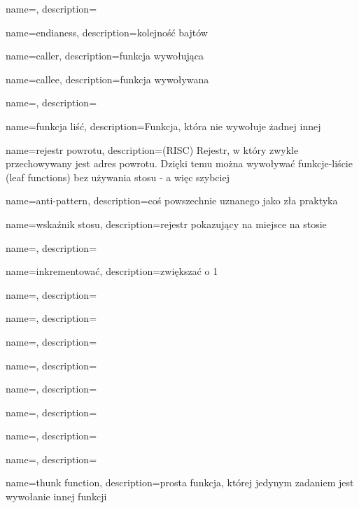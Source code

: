 {
  name={\PLph},
  description={\PLph}
}

{
  name={endianess},
  description={kolejność bajtów}
}

{
  name={caller},
  description={funkcja wywołująca}
}

{
  name={callee},
  description={funkcja wywoływana}
}

{
  name={\PLph},
  description={\PLph}
}

{
  name={funkcja liść},
  description={Funkcja, która nie wywołuje żadnej innej}
}

{
  name={rejestr powrotu},
  description=(RISC) {Rejestr, w który zwykle przechowywany jest adres powrotu. Dzięki temu można wywoływać funkcje-liście (leaf functions) bez używania stosu - a więc szybciej}
}

{
  name={anti-pattern},
  description={coś powszechnie uznanego jako zła praktyka}
}

{
  name=wskaźnik stosu,
  description={rejestr pokazujący na miejsce na stosie}
}

{
  name={\PLph},
  description={\PLph}
}

{
  name={inkrementować},
  description={zwiększać o 1}
}

{
  name={\PLph},
  description={\PLph}
}

{
  name={\PLph},
  description={\PLph}
}

{
  name={\PLph},
  description={\PLph}
}

{
  name={\PLph},
  description={\PLph}
}

{
  name={\PLph},
  description={\PLph}
}

{
  name={\PLph},
  description={\PLph}
}

{
  name={\PLph},
  description={\PLph}
} 

{
  name={\PLph},
  description={\PLph}
}

{
  name={thunk function},
  description={prosta funkcja, której jedynym zadaniem jest wywołanie innej funkcji}
}

